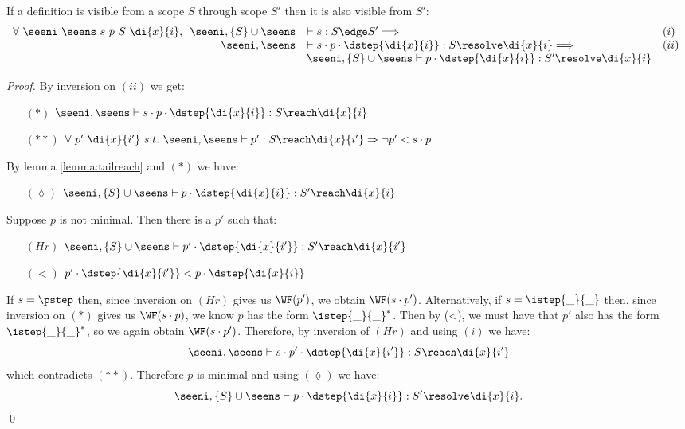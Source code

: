 \begin{lemma} \label{lemma:tailres}
If a definition is visible from a scope $S$ through scope $S'$ then it is also visible from $S'$:\\
\begin{equation*}
\forall\ \seeni\ \seens\ s\ p\ S\ \di{x}{i}, 
\begin{array}[t]{rll}
\seeni,\{S\}\cup\seens & \vdash s : S \edge S' \Longrightarrow & (i) \\
\seeni,\seens & \vdash s \cdot p \cdot \dstep{\di{x}{i}} : S \resolve \di{x}{i} \Longrightarrow & (ii)\\ 
& \seeni,\{S\}\cup\seens \vdash p \cdot \dstep{\di{x}{i}} : S' \resolve \di{x}{i}  
\end{array}
\end{equation*}
\end{lemma}
\begin{proof} By inversion on $(ii)$
we get:
\begin{itemize}[leftmargin=15mm]
 \item[$(*)$\tab] $\seeni,\seens \vdash s \cdot p \cdot \dstep{\di{x}{i}} : S \reach \di{x}{i}$ 
 \item[$(**)$\tab] $\forall\ p'\ \di{x}{i'}\ s.t.\ \seeni,\seens \vdash p' : S \reach \di{x}{i'} \Rightarrow \neg p' < s\cdot p $ 
\end{itemize}
By lemma \ref{lemma:tailreach} and $(*)$ we have:
\begin{itemize}[leftmargin=15mm]
 \item[$(\lozenge)$\tab] $\seeni,\{S\}\cup\seens \vdash p \cdot \dstep{\di{x}{i}} : S' \reach \di{x}{i}$
\end{itemize}
Suppose $p$ is not minimal. Then there is a $p'$ such that:
\begin{itemize}[leftmargin=15mm]
 \item[$(Hr)$\tab] $\seeni,\{S\}\cup\seens \vdash p' \cdot \dstep{\di{x}{i'}} : S' \reach \di{x}{i'}$
 \item[$(<)$\tab] $ p' \cdot \dstep{\di{x}{i'}} < p \cdot \dstep{\di{x}{i}} $
\end{itemize}
If $s = \pstep$ then, since inversion on $(Hr)$ gives us $\WF(p')$, we obtain $\WF(s \cdot p')$.
Alternatively, if $s = \istep{\_}{\_}$ then, since inversion on $(*)$ gives us $\WF(s\cdot p)$, we know $p$
has the form $\istep{\_}{\_}^*$.
Then by (<), we must have that $p'$ also has the form $\istep{\_}{\_}^*$, so we again obtain $\WF(s \cdot p')$.
Therefore, by inversion of $(Hr)$ and using $(i)$ we have: \\
\begin{equation*}
\seeni,\seens \vdash s\cdot p'\cdot\dstep{\di{x}{i'}} : S \reach \di{x}{i'}  
\end{equation*}
which contradicts $(**)$.
Therefore $p$ is minimal and using $(\lozenge)$ we have:
\begin{equation*}
\seeni,\{S\}\cup\seens \vdash p \cdot \dstep{\di{x}{i}} : S' \resolve \di{x}{i}.
\end{equation*}\qed
\end{proof}

